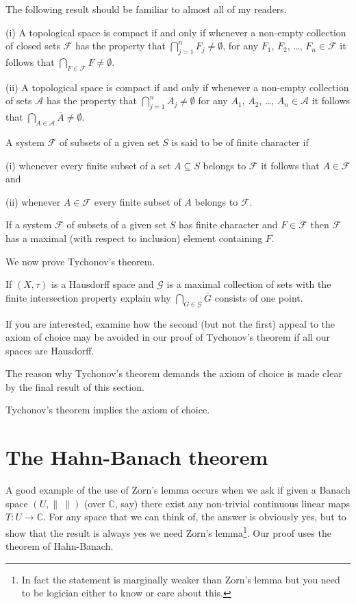 The following result should be familiar to almost
all of my readers.
\begin{lemma} 
(i) A topological
space is compact if and only if whenever a non-empty collection
of closed sets ${\mathcal F}$ has the property
that $\bigcap_{j=1}^{n}F_{j}\neq\emptyset$,
for any $F_{1}$, $F_{2}$, \dots, $F_{n}\in {\mathcal F}$
it follows that $\bigcap_{F\in{\mathcal F}}F\neq\emptyset$.

(ii) A topological
space is compact if and only if whenever a non-empty collection
of sets ${\mathcal A}$ has the property
that $\bigcap_{j=1}^{n}A_{j}\neq\emptyset$
for any $A_{1}$, $A_{2}$, \dots, $A_{n}\in {\mathcal A}$
it follows that $\bigcap_{A\in{\mathcal A}}\bar{A}\neq\emptyset$.
\end{lemma}
\begin{definition} A system ${\mathcal F}$
of subsets of a given set $S$ is said to be of finite character
if 

(i) whenever every finite subset of a set $A\subseteq S$
belongs to ${\mathcal F}$ it follows that $A\in{\mathcal F}$
and

(ii) whenever $A\in{\mathcal F}$ every finite subset
of $A$ belongs to ${\mathcal F}$.
\end{definition}
\begin{lemma}  If a system ${\mathcal F}$
of subsets of a given set $S$ has finite character
and $F\in{\mathcal F}$ then ${\mathcal F}$ has a maximal 
(with respect to inclusion) element containing $F$.
\end{lemma}
We now prove Tychonov's theorem.

\begin{added}[Exercise] If $(X,\tau)$ is a Hausdorff
space and ${\mathcal G}$ is a maximal collection 
of sets with the finite intersection property
explain why $\bigcap_{G\in{\mathcal G}}\bar{G}$
consists of one point.

If you are interested, examine how the second 
(but not the first) appeal to the axiom of choice
may be avoided in our proof of Tychonov's theorem
if all our spaces are Hausdorff.
\end{added} 

The reason why Tychonov's theorem demands the axiom 
of choice is made clear by the final result
of this section.
\begin{lemma} Tychonov's theorem implies the axiom 
of choice.
\end{lemma}
\section{The Hahn-Banach theorem} A good example
of the use of Zorn's lemma occurs when we ask
if given a Banach space $(U,\|\ \|)$ (over ${\mathbb C}$,
say) there exist
any non-trivial continuous linear maps $T:U\rightarrow{\mathbb C}$.
For any space that we can think of, the answer is
obviously yes, but to show that the result is
always yes we need Zorn's lemma\footnote{In fact the statement
is marginally weaker than Zorn's lemma but you need to
be logician either to know or care about this.}.
Our proof uses the theorem of Hahn-Banach.

